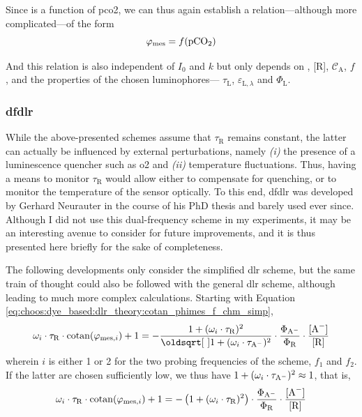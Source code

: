 Since \ce{[A^-]} is a function of \gls{pco2}, we can thus again establish a relation---although more complicated---of the form
\begin{equation}
	\varphi_\text{mes} = f(\ce{pCO_2})
\end{equation}

And this relation is also independent of $I_0$ and $k$ but only depends on \ce{[Q^+]}, [R], $\mathcal{C}_\mathrm{A}$, $f$, and the properties of the chosen luminophores---\ie{} $\tau_\mathrm{L}$, $\varepsilon_{\mathrm{L}, \lambda}$ and $\Phi_\mathrm{L}$.

\subsubsection{\texorpdfstring{\gls{dfdlr}}{Dual Frequency DLR}}\label{subsect:choos:dye_based:dlr_theory:dfdlr}

While the above-presented schemes assume that $\tau_\mathrm{R}$ remains constant, the latter can actually be influenced by external perturbations, namely \emph{(i)} the presence of a luminescence quencher such as \gls{o2} and \emph{(ii)} temperature fluctuations\cite{lam2011}. Thus, having a means to monitor $\tau_\mathrm{R}$ would allow either to compensate for quenching, or to monitor the temperature of the sensor optically. To this end, \gls{dfdlr} was developed by Gerhard Neurauter in the course of his PhD thesis\cite{neurauter2000_phd} and barely used ever since\cite{borisov2006, kocincova2007, borisov2011}. Although I did not use this dual-frequency scheme in my experiments, it may be an interesting avenue to consider for future improvements, and it is thus presented here briefly for the sake of completeness.

The following developments only consider the simplified \gls{dlr} scheme, but the same train of thought could also be followed with the general \gls{dlr} scheme, although leading to much more complex calculations. Starting with Equation \ref{eq:choos:dye_based:dlr_theory:cotan_phimes_f_chm_simp},
\begin{equation}
	\omega_i \cdot \tau_\mathrm{R} \cdot \cotan(\varphi_{\text{mes}, i}) + 1 = - \frac{1 + (\omega_i \cdot \tau_\mathrm{R})^2}{\sqrt{1 + (\omega_i \cdot \tau_\mathrm{A\spminus})^2}}\cdot \frac{\Phi_\mathrm{A\spminus}}{\Phi_\mathrm{R}}\cdot \frac{\ce{[A^-]}}{\ce{[R]}}
\end{equation}
wherein $i$ is either 1 or 2 for the two probing frequencies of the scheme, $f_1$ and $f_2$. If the latter are chosen sufficiently low, we thus have $1 + (\omega_i \cdot \tau_\mathrm{A^{\smash{-}}})^2 \approx 1$, that is,
\begin{equation}
	\omega_i \cdot \tau_\mathrm{R} \cdot \cotan(\varphi_{\text{mes}, i}) + 1 = - \left(1 + (\omega_i \cdot \tau_\mathrm{R})^2 \right) \cdot \frac{\Phi_\mathrm{A\spminus}}{\Phi_\mathrm{R}}\cdot \frac{\ce{[A^-]}}{\ce{[R]}}
\end{equation}

